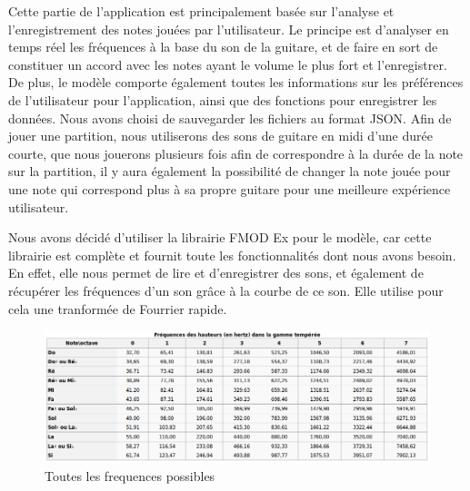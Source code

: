 Cette partie de l'application est principalement basée sur l'analyse et l'enregistrement des notes jouées par 
l'utilisateur. Le principe est d'analyser en temps réel les fréquences à la base du son de la guitare, et de faire en sort de constituer un accord
avec les notes ayant le volume le plus fort et l'enregistrer. De plus, le modèle comporte également toutes les informations sur les préférences
de l'utilisateur pour l'application,   ainsi que des fonctions pour enregistrer les données. Nous avons choisi de sauvegarder les fichiers au format JSON. \newline
Afin de jouer une partition, nous utiliserons des sons de guitare en midi d'une durée courte, que nous jouerons plusieurs fois afin de correspondre à la durée de la note sur la partition, il y aura également la possibilité de changer la note jouée pour une note qui correspond plus à sa propre guitare pour une meilleure expérience utilisateur.

Nous avons décidé d'utiliser la librairie FMOD Ex pour le modèle, car cette librairie est complète et fournit toute les fonctionnalités dont nous avons besoin. En effet, elle nous permet de lire et d'enregistrer des sons, et également de récupérer les fréquences d'un son grâce à la courbe de ce son. Elle utilise pour cela une tranformée de Fourrier rapide. 

\begin{figure}[H]
\centering
\includegraphics[scale=0.5]{Frequences}
\caption{Toutes les frequences possibles}
\end{figure}